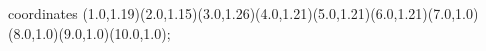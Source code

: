 					coordinates { (1.0,1.19)(2.0,1.15)(3.0,1.26)(4.0,1.21)(5.0,1.21)(6.0,1.21)(7.0,1.0)(8.0,1.0)(9.0,1.0)(10.0,1.0)};